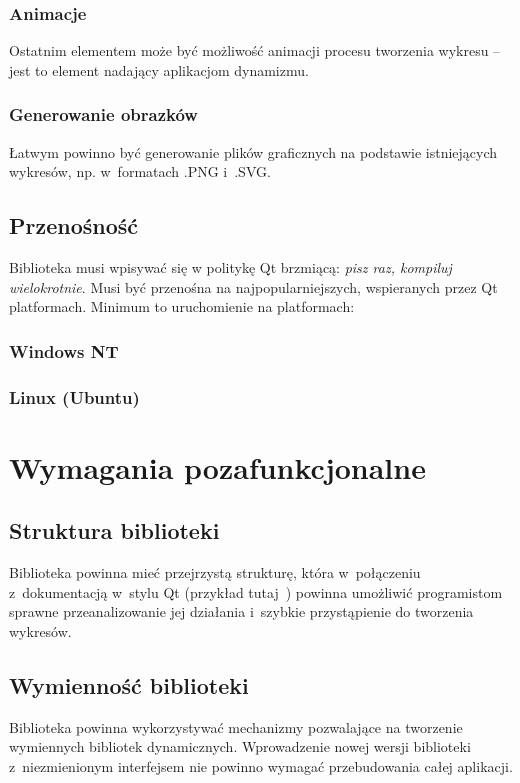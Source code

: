 \documentclass[11pt,twoside,a4paper,final]{article}
\begin{document}
\subsubsection{Animacje}
Ostatnim elementem może być możliwość animacji procesu tworzenia wykresu -- jest to element nadający aplikacjom dynamizmu. 

\subsubsection{Generowanie obrazków}
Łatwym powinno być generowanie plików graficznych na podstawie istniejących wykresów, np. w~formatach .PNG i~.SVG.

\subsection{Przenośność}
Biblioteka musi wpisywać się w politykę Qt brzmiącą: \textit{pisz raz, kompiluj wielokrotnie}. Musi być przenośna na najpopularniejszych, wspieranych przez Qt platformach. Minimum to uruchomienie na platformach:

\subsubsection{Windows NT}
\subsubsection{Linux (Ubuntu)}


\section{Wymagania pozafunkcjonalne}


\subsection{Struktura biblioteki}
Biblioteka powinna mieć przejrzystą strukturę, która w~połączeniu z~dokumentacją w~stylu Qt (przykład tutaj~\cite{qt-doc}) powinna umożliwić programistom sprawne przeanalizowanie jej działania i~szybkie przystąpienie do tworzenia wykresów.

\subsection{Wymienność biblioteki}
Biblioteka powinna wykorzystywać mechanizmy pozwalające na tworzenie wymiennych bibliotek dynamicznych. Wprowadzenie nowej wersji biblioteki z~niezmienionym interfejsem nie powinno wymagać przebudowania całej aplikacji.
\end{document}
